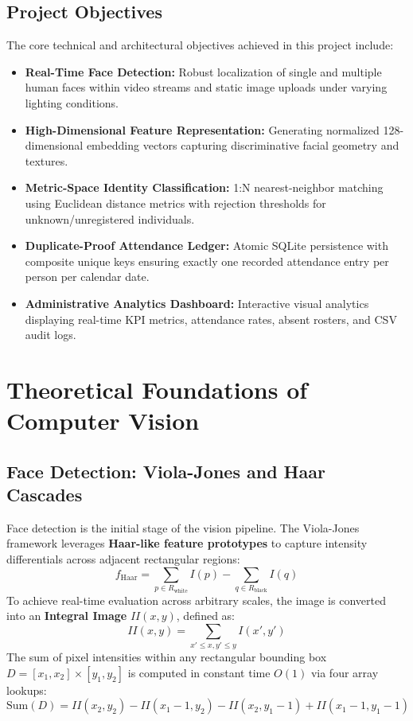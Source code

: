 \documentclass[12pt,a4paper]{article}
\begin{document}
\subsection{Project Objectives}
The core technical and architectural objectives achieved in this project include:
\begin{itemize}
    \item \textbf{Real-Time Face Detection:} Robust localization of single and multiple human faces within video streams and static image uploads under varying lighting conditions.
    \item \textbf{High-Dimensional Feature Representation:} Generating normalized 128-dimensional embedding vectors capturing discriminative facial geometry and textures.
    \item \textbf{Metric-Space Identity Classification:} 1:N nearest-neighbor matching using Euclidean distance metrics with rejection thresholds for unknown/unregistered individuals.
    \item \textbf{Duplicate-Proof Attendance Ledger:} Atomic SQLite persistence with composite unique keys ensuring exactly one recorded attendance entry per person per calendar date.
    \item \textbf{Administrative Analytics Dashboard:} Interactive visual analytics displaying real-time KPI metrics, attendance rates, absent rosters, and CSV audit logs.
\end{itemize}

\section{Theoretical Foundations of Computer Vision}
\label{sec:theory}

\subsection{Face Detection: Viola-Jones and Haar Cascades}
Face detection is the initial stage of the vision pipeline. The Viola-Jones framework leverages \textbf{Haar-like feature prototypes} to capture intensity differentials across adjacent rectangular regions:
\begin{equation}
    f_{\text{Haar}} = \sum_{p \in R_{\text{white}}} I(p) - \sum_{q \in R_{\text{black}}} I(q)
\end{equation}
To achieve real-time evaluation across arbitrary scales, the image is converted into an \textbf{Integral Image} $II(x, y)$, defined as:
\begin{equation}
    II(x, y) = \sum_{x' \leq x, y' \leq y} I(x', y')
\end{equation}
The sum of pixel intensities within any rectangular bounding box $D = [x_1, x_2] \times [y_1, y_2]$ is computed in constant time $O(1)$ via four array lookups:
\begin{equation}
    \text{Sum}(D) = II(x_2, y_2) - II(x_1-1, y_2) - II(x_2, y_1-1) + II(x_1-1, y_1-1)
\end{equation}
\end{document}
